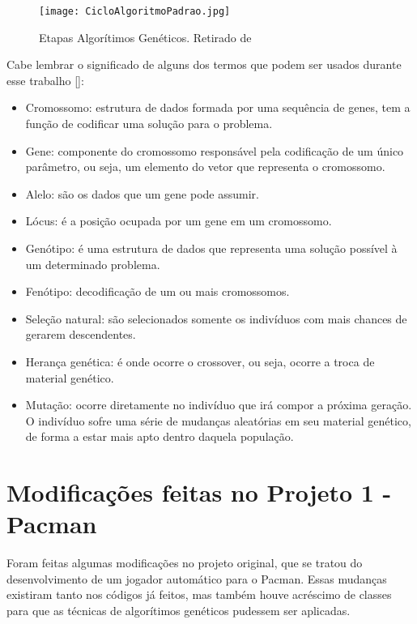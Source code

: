 \documentclass[12pt, a4paper, english, brazil]{abntex2}
\begin{document}
\begin{figure}[H]
\centering
\texttt{[image: CicloAlgoritmoPadrao.jpg]}
\caption{Etapas Algorítimos Genéticos. Retirado de \cite{algEvo}}
\label{fig:algGen}
\end{figure}

Cabe lembrar o significado de alguns dos termos que podem ser usados durante esse trabalho [\cite{algEvo}]:
\begin{itemize}
\item Cromossomo: estrutura de dados formada por uma sequência de genes, tem a função de codificar uma solução para o problema.

\item Gene: componente do cromossomo responsável pela codificação de um único parâmetro, ou seja, um elemento do vetor que representa o cromossomo.

\item Alelo:  são os dados que um gene pode assumir.

\item Lócus: é a posição ocupada por um gene em um cromossomo.

\item Genótipo: é uma estrutura de dados que representa uma solução possível à um determinado problema.

\item Fenótipo: decodificação de um ou mais cromossomos.

\item Seleção natural: são selecionados somente os indivíduos com mais chances de gerarem descendentes.

\item Herança genética: é onde ocorre o crossover, ou seja, ocorre a troca de material genético. 

\item Mutação: ocorre diretamente no indivíduo que irá compor a próxima geração. O indivíduo sofre uma série de mudanças aleatórias em seu material genético, de forma a estar mais apto dentro daquela população.

\end{itemize}


\chapter{Modificações feitas no Projeto 1 - Pacman}
Foram feitas algumas modificações no projeto original, que se tratou do desenvolvimento de um jogador automático para o Pacman. Essas mudanças existiram tanto nos códigos já feitos, mas também houve acréscimo de classes para que as técnicas de algorítimos genéticos pudessem ser aplicadas.
\end{document}
